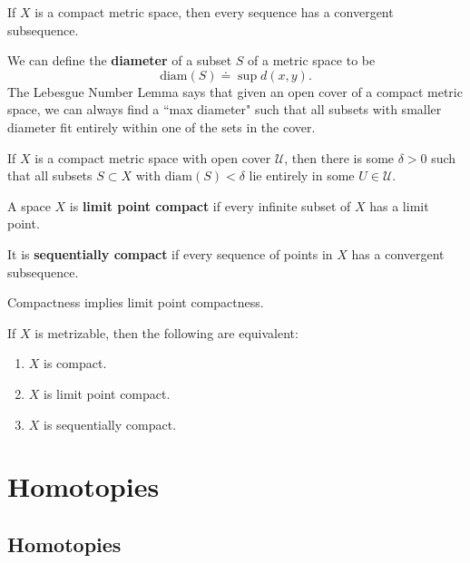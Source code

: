 \documentclass[twoside,10pt]{report}
\begin{document}
\begin{prop}[]
If $X$ is a compact metric space, then every sequence has a convergent subsequence.
\end{prop}

We can define the \textbf{diameter} of a subset $S$ of a metric space to be
\[
	\text{diam}(S) \doteq \sup d(x,y).
\] The Lebesgue Number Lemma says that given an open cover of a compact metric space, we can always find a ``max diameter" such that all subsets with smaller diameter fit entirely within one of the sets in the cover.
\begin{thrm}
	If $X$ is a compact metric space with open cover $\mathcal{U}$, then there is some $\delta>0$ such that all subsets $S\subset X$ with $\text{diam}(S) < \delta$ lie entirely in some $U \in \mathcal{U}$.
\end{thrm}

\begin{defn}[]
A space $X$ is \textbf{limit point compact} if every infinite subset of $X$ has a limit point.

It is \textbf{sequentially compact} if every sequence of points in $X$ has a convergent subsequence.
\end{defn}

\begin{prop}
Compactness implies limit point compactness.
\end{prop}

\begin{thrm}[]
If $X$ is metrizable, then the following are equivalent:
\begin{enumerate}
	\item $X$ is compact.
	\item $X$ is limit point compact.
	\item $X$ is sequentially compact.
\end{enumerate}
\end{thrm}


\chapter{Homotopies}


\section{Homotopies}
\end{document}

